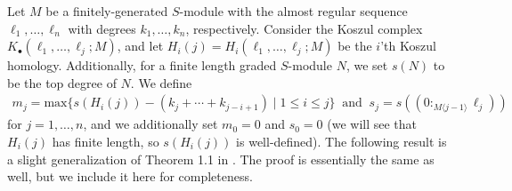 \documentclass[a4paper, 10pt, reqno, english, ones]{amsart}  %
\theoremstyle{definition}
\theoremstyle{remark}
\begin{document}
Let $M$ be a finitely-generated $S$-module with the almost regular sequence $\ell_1,\dots,\ell_n$ with degrees $k_1,\dots,k_n$, respectively. Consider the Koszul complex $K_{\bullet}(\ell_1,\dots,\ell_j;M)$, and let $H_i(j)=H_{i}(\ell_1,\dots,\ell_j;M)$ be the $i$'th Koszul homology. Additionally, for a finite length graded $S$-module $N$, we set $s(N)$ to be the top degree of $N$. We define
\begin{align*}
    m_j =\textrm{max}\{s(H_i(j)) - (k_j+\cdots+k_{j-i+1})\mid 1\leq i\leq j \}\ \textrm{ and }\ s_j = s\left((0:_{M\langle j-1 \rangle} \ell_j) \right)
\end{align*}
for $j=1,\dots,n$, and we additionally set $m_0=0$ and $s_0=0$ (we will see that $H_i(j)$ has finite length, so $s(H_i(j))$ is well-defined). The following result is a slight generalization of Theorem 1.1 in \cite{aramova2000Almost}. The proof is essentially the same as well, but we include it here for completeness.
\end{document}
